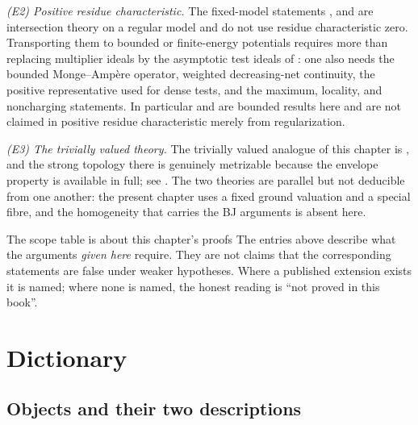 \emph{(E2) Positive residue characteristic.}  The fixed-model statements
,  and
 are intersection theory on a regular model and do
not use residue characteristic zero.  Transporting them to bounded or
finite-energy potentials requires more than replacing multiplier ideals by
the asymptotic test ideals of \cite{GJKM19}: one also needs the bounded
Monge--Amp\`ere operator, weighted decreasing-net continuity, the positive
representative used for dense tests, and the maximum, locality, and
noncharging statements.  In particular
 and
 are bounded results here and are not claimed
in positive residue characteristic merely from regularization.

\emph{(E3) The trivially valued theory.}  The trivially valued analogue of
this chapter is , and the strong
topology there is genuinely metrizable because the envelope property is
available in full; see .  The two theories are
parallel but not deducible from one another: the present chapter uses a fixed
ground valuation and a special fibre, and the homogeneity that carries the BJ
arguments is absent here.

\begin{warning}{The scope table is about this chapter's proofs}
The entries above describe what the arguments \emph{given here} require.
They are not claims that the corresponding statements are false under weaker
hypotheses.  Where a published extension exists it is named; where none is
named, the honest reading is ``not proved in this book''.
\end{warning}

\section{Dictionary}
\label{sec:ch26-dictionary}

\subsection{Objects and their two descriptions}
\label{sec:ch26-dict-objects}

